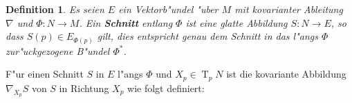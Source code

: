 \documentclass[paper=A4, twoside, chapterprefix=true, bibliography=totoc, headsepline]{scrbook}
\DeclareMathOperator{\T}{T}         %
\theoremstyle{plain}
\newtheorem{Dfn}{Definition}[chapter]
\theoremstyle{nonumberplain}
\theoremstyle{empty}
\theoremstyle{break}
\newcommand{\CmIndex}[2][]{\ifthenelse{\isempty{#1}}{\index{#2}}{\index{#1}}#2}
\newcommand{\CmMark}[2][]{\textbf{\CmIndex[#1]{#2}}}
\begin{document}
\begin{Dfn}
  Es seien $E$ ein Vektorb"undel "uber $M$ mit kovarianter Ableitung $\nabla$ und $\Phi: N \to M$.
  Ein \CmMark{Schnitt} entlang $\Phi$ ist eine glatte Abbildung $S: N \to E$, so dass $S(p) \in E_{\Phi(p)}$ gilt, dies entspricht genau dem Schnitt in das l"angs $\Phi$ zur"uckgezogene B"undel $\Phi^*$.
  \begin{center}\end{center}
\end{Dfn}
F"ur einen Schnitt $S$ in $E$ l"angs $\Phi$ und $X_p \in \T_pN$ ist die kovariante Abbildung $\nabla_{X_p}S$ von $S$ in Richtung $X_p$ wie folgt definiert:
\end{document}

